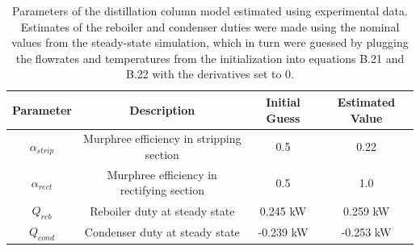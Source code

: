 \begin{table}[]
    \centering
    \begin{tabular}{cccc}
        \textbf{Parameter} & \textbf{Description} & \textbf{Initial Guess} & \textbf{Estimated Value}  \\
        \hline
         $\alpha_{strip}$ & Murphree efficiency in stripping section &  0.5 & 0.22 \\ 
         $\alpha_{rect}$ & Murphree efficiency in rectifying section & 0.5 & 1.0 \\
         $ Q_{reb}$ & Reboiler duty at steady state &  0.245 kW  & 0.259 kW  \\
         $ Q_{cond}$ & Condenser duty at steady state &  -0.239 kW  & -0.253 kW
    \end{tabular}
    \caption{Parameters of the distillation column model estimated using experimental data. Estimates of the reboiler and condenser duties were made using the nominal values from the steady-state simulation, which in turn were guessed by plugging the flowrates and temperatures from the initialization into equations B.21 and B.22 with the derivatives set to 0.}
    \label{tab:param_estimation}
\end{table}

